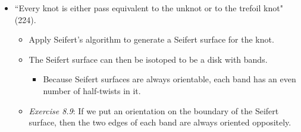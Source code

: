 \documentclass[titlepage]{article}
\numberwithin{figure}{section}
\numberwithin{table}{section}
\numberwithin{equation}{section}
\newcommand{\dq}[2]{``#1" (#2).}
\begin{document}
\begin{itemize}
\begin{figure}[h!]
\begin{subfigure}[b]{0.15\linewidth}
            \caption{Passed.}
            \label{fig:ex8-8-2c}
        \end{subfigure}
        \begin{subfigure}[b]{0.25\linewidth}
            \centering
            \texttt{[image: ../Notes/Blender/ex8-8-2d.png]}
            \caption{Stretched.}
            \label{fig:ex8-8-2d}
        \end{subfigure}
        \caption{Solution to \emph{Exercise 8.8}.}
        \label{fig:ex8-8-2}
    \end{figure}
    \begin{itemize}
        \item Recall the relationship between twist and writhe throughout the following.
        \item Figure \ref{fig:ex8-8-2a} resembles Figure \ref{fig:ex8-8b}.
        \item From Figure \ref{fig:ex8-8-2a} to \ref{fig:ex8-8-2b}, perform a Type I Reidemeister move on each strand of Figure \ref{fig:ex8-8-2a} and then "slide" the top one over the bottom one using a sequence of Type II and III Reidemeister moves.
        \item From Figure \ref{fig:ex8-8-2b} to \ref{fig:ex8-8-2c}, perform a pass-move.
        \item From Figure \ref{fig:ex8-8-2c} to \ref{fig:ex8-8-2d}, imagine pulling the right two ends in Figure \ref{fig:ex8-8-2c} farther to the right and vice versa for the left two ends. As it stretches, it assumes the projection of the braid shown, which is equivalent to Figure \ref{fig:ex8-8a}. This transition could be accomplished through a series of Reidemeister moves as well.
    \end{itemize}
    \item \dq{Every knot is either pass equivalent to the unknot or to the trefoil knot}{224}
    \begin{itemize}
        \item Apply Seifert's algorithm to generate a Seifert surface for the knot.
        \item The Seifert surface can then be isotoped to be a disk with bands.
        \begin{itemize}
            \item Because Seifert surfaces are always orientable, each band has an even number of half-twists in it.
        \end{itemize}
        \item \emph{Exercise 8.9}: If we put an orientation on the boundary of the Seifert surface, then the two edges of each band are always oriented oppositely.

\end{itemize}
\end{itemize}
\end{document}
